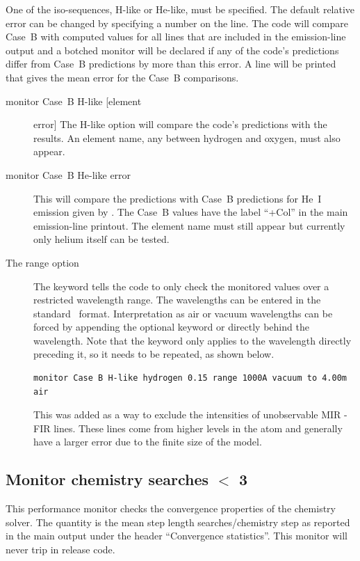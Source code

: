One of the iso-sequences, H-like or He-like, must be specified.
The default
relative error can be changed by specifying a number on the line.
The code
will compare Case~B with computed values for all lines that are included
in the emission-line output
and a botched monitor will be declared if any
of the code's predictions differ from Case~B predictions by more than this
error.
A line will be printed that gives the mean error for the Case~B
comparisons.
\begin{description}
\item[monitor Case~B H-like [element] error]  The H-like option will compare
the code's predictions with the \citet{Storey1995} results.  An element
name, any between hydrogen and oxygen, must also appear.

\item[monitor Case~B He-like error]  This will compare the predictions with Case~B predictions for He~I emission given by 
\citet{Porter.R12Improved-He-I-emissivities-in-the-case-B-approximation, Porter.R13-CaseB-erratum}.  
The Case~B values have the label ``+Col'' in the main emission-line printout. The
element name must still appear but currently only helium itself can be
tested.

\item[The range option]  The keyword 
tells the code to only check the
monitored values over a restricted wavelength range.
The wavelengths can be entered in the standard \Cloudy\ format.
Interpretation as air or vacuum wavelengths can be forced by appending the optional keyword
 or  directly behind the wavelength. Note that the keyword
only applies to the wavelength directly preceding it, so it needs to be repeated, as shown below.
\begin{verbatim}
monitor Case B H-like hydrogen 0.15 range 1000A vacuum to 4.00m air
\end{verbatim}
This was added as a way to exclude the intensities of
unobservable MIR - FIR lines.  These lines come from higher levels in the
atom and generally have a larger error due to the finite size of the model.
\end{description}

\subsection{Monitor chemistry searches $<$ 3}

This performance monitor checks the convergence properties of the chemistry
solver. The quantity is the mean step length searches/chemistry step as
reported in the main output under the header ``Convergence statistics''.
This monitor will never trip in release code.

